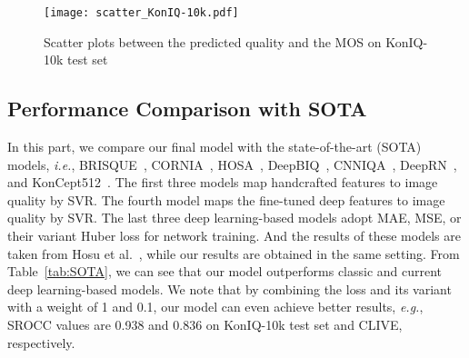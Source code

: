 \documentclass[sigconf]{acmart}
\begin{document}
\begin{figure}[!htb]
    \centering
    \texttt{[image: scatter\_KonIQ-10k.pdf]}
    \caption{Scatter plots between the predicted quality and the MOS on KonIQ-10k test set}
    \label{fig:scatters}
\end{figure}

\begin{table}[!htb]
\centering
\caption{Performance comparison with SOTA on KonIQ-10k test set and the whole CLIVE}
\label{tab:SOTA}
\end{table}

\subsection{Performance Comparison with SOTA} 
In this part, we compare our final model with the state-of-the-art (SOTA) models, \textit{i.e.}, BRISQUE~\cite{mittal2012no}, CORNIA~\cite{ye2012unsupervised}, HOSA~\cite{xu2016blind}, DeepBIQ~\cite{bianco2018use}, CNNIQA~\cite{kang2014convolutional}, DeepRN~\cite{varga2018deeprn}, and KonCept512~\cite{hosu2019koniq}.
The first three models map handcrafted features to image quality by SVR.
The fourth model maps the fine-tuned deep features to image quality by SVR.
The last three deep learning-based models adopt MAE, MSE, or their variant Huber loss for network training. 
And the results of these models are taken from Hosu et al.~, while our results are obtained in the same setting.
From Table~\ref{tab:SOTA}, we can see that our model outperforms classic and current deep learning-based models. 
We note that by combining the loss and its variant with a weight of 1 and 0.1, our model can even achieve better results, \textit{e.g.}, SROCC values are 0.938 and 0.836 on KonIQ-10k test set and CLIVE, respectively.
\end{document}
